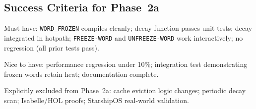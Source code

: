 \subsection{Success Criteria for Phase~2a}

Must have: \texttt{WORD\_FROZEN} compiles cleanly; decay function passes
unit tests; decay integrated in hotpath; \texttt{FREEZE-WORD} and
\texttt{UNFREEZE-WORD} work interactively; no regression (all prior
tests pass).

Nice to have: performance regression under 10\%; integration test
demonstrating frozen words retain heat; documentation complete.

Explicitly excluded from Phase~2a: cache eviction logic changes;
periodic decay scan; Isabelle/HOL proofs; StarshipOS real-world validation.

